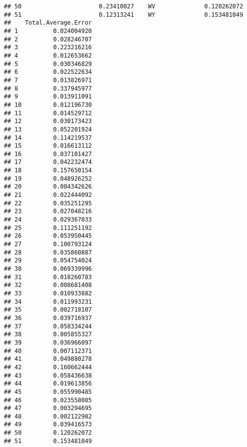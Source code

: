 \documentclass{article}\usepackage[]{graphicx}\usepackage[]{color}
\makeatletter
\newenvironment{kframe}{%
 \def\at@end@of@kframe{}%
 \ifinner\ifhmode%
  \def\at@end@of@kframe{\end{minipage}}%
  \begin{minipage}{\columnwidth}%
 \fi\fi%
 \def\FrameCommand##1{\hskip\@totalleftmargin \hskip-\fboxsep
 \colorbox{shadecolor}{##1}\hskip-\fboxsep
     \hskip-\linewidth \hskip-\@totalleftmargin \hskip\columnwidth}%
 \MakeFramed {\advance\hsize-\width
   \@totalleftmargin\z@ \linewidth\hsize
   \@setminipage}}%
 {\par\unskip\endMakeFramed%
 \at@end@of@kframe}
\newenvironment{knitrout}{}{} %
\makeatother
\begin{document}
\begin{knitrout}
\begin{kframe}
\begin{verbatim}
## 50                      0.23410027    WV              0.120262072
## 51                      0.12313241    WY              0.153481049
##    Total.Average.Error
## 1          0.024004920
## 2          0.028246707
## 3          0.223216216
## 4          0.012653662
## 5          0.030346829
## 6          0.022522634
## 7          0.013826971
## 8          0.337945977
## 9          0.013911091
## 10         0.012196730
## 11         0.014529712
## 12         0.030173423
## 13         0.052201924
## 14         0.114219537
## 15         0.016613112
## 16         0.037101427
## 17         0.042232474
## 18         0.157650154
## 19         0.048926252
## 20         0.004342626
## 21         0.022444092
## 22         0.035251295
## 23         0.027048216
## 24         0.029367033
## 25         0.111251192
## 26         0.053950445
## 27         0.100793124
## 28         0.035860887
## 29         0.054754024
## 30         0.069339996
## 31         0.018260783
## 32         0.008681408
## 33         0.010933882
## 34         0.011993231
## 35         0.002718107
## 36         0.039716937
## 37         0.058334244
## 38         0.005855327
## 39         0.036966097
## 40         0.007112371
## 41         0.049880278
## 42         0.160662444
## 43         0.058436638
## 44         0.019613856
## 45         0.055990485
## 46         0.023558085
## 47         0.003294695
## 48         0.002122982
## 49         0.039416573
## 50         0.120262072
## 51         0.153481049
\end{verbatim}
\end{kframe}
\end{knitrout}
\end{document}
